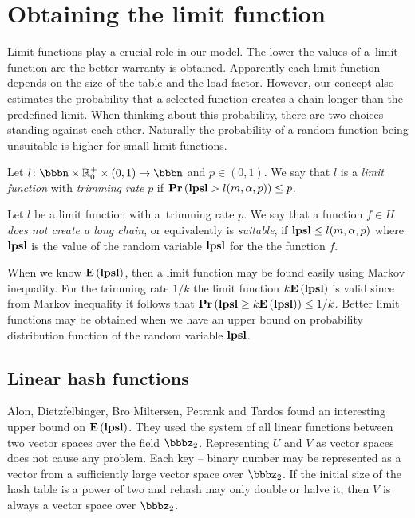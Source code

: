 \section{Obtaining the limit function}
\label{section-limit}
Limit functions play a crucial role in our model. The lower the values of a~limit function are the better warranty is obtained. Apparently each limit function depends on the size of the table and the load factor. However, our concept also estimates the probability that a selected function creates a chain longer than the predefined limit. When thinking about this probability, there are two choices standing against each other. Naturally the probability of a random function being unsuitable is higher for small limit functions.

\begin{definition}
\label{definition-limit-function}
Let $l\colon \bbbn \times \mathbb{R}_0^+ \times (0, 1) \rightarrow \bbbn$ and $p \in (0, 1)$.  We say that $l$ is a \emph{limit function} with \emph{trimming rate} $p$ if $\mathbf{Pr}\left(\mathbf{lpsl} > l(m, \alpha, p)\right) \leq p$.

Let $l$ be a limit function with a~trimming rate $p$. We say that a function $f \in H$ \emph{does not create a long chain}, or equivalently is \emph{suitable}, if $\mathbf{lpsl} \le l(m, \alpha, p)$ where $\mathbf{lpsl}$ is the value of the random variable $\mathbf{lpsl}$ for the the function $f$.
\end{definition}

When we know $\mathbf{E}\left(\mathbf{lpsl}\right)$, then a limit function may be found easily using Markov inequality. For the trimming rate $1/k$ the limit function $k \mathbf{E}\left(\mathbf{lpsl}\right)$ is valid since from Markov inequality it follows that $\mathbf{Pr}\left(\mathbf{lpsl} \geq k \mathbf{E}\left(\mathbf{lpsl}\right)\right) \leq {1}/{k}$. Better limit functions may be obtained when we have an upper bound on probability distribution function of the random variable $\mathbf{lpsl}$.

\subsection{Linear hash functions}
Alon, Dietzfelbinger, Bro Miltersen, Petrank and Tardos \cite{DBLP:journals/jacm/AlonDMPT99} found an interesting upper bound on $\mathbf{E}\left(\mathbf{lpsl}\right)$. They used the system of all linear functions between two vector spaces over the field $\bbbz_2$. Representing $U$ and $V$ as vector spaces does not cause any problem. Each key -- binary number may be represented as a vector from a sufficiently large vector space over $\bbbz_2$. If the initial size of the hash table is a power of two and rehash may only double or halve it, then $V$ is always a vector space over $\bbbz_2$.


